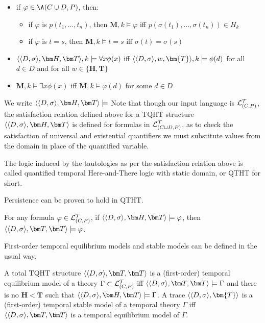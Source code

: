\begin{itemize}
  \item if $\varphi \in \A(C \cup D,P)$, then:
    \begin{itemize}
    \item if $\varphi$ is $p(t_1,\dots,t_n)$, then $\bm{M},k \models \varphi$ iff $p(\sigma(t_1), \dots, \sigma(t_n))\in H_k$
    \item if $\varphi$ is $t = s$, then  $\bm{M},k \models t = s$ iff $\sigma(t) = \sigma(s)$
    \end{itemize}
  \item $\qthandt,k \models \forall x \phi(x)$ iff $\langle \dsigma, w,\bm{T} \rangle,k \models \phi(d)$ for all $d \in D$ and for all $w \in \{\bm{H}, \bm{T}\}$ 
  \item $\bm{M},k \models \exists x \phi(x)$ iff $\bm{M},k \models \varphi(d)$ for some $d \in D$
  \end{itemize}
  We write $\qthandt \models$
Note that though our input language is $\mathcal{L}_{(C,P)}^\mathcal{T}$, the satisfaction
relation defined above for a TQHT structure $\qthandt$ is defined for
formulas in $\mathcal{L}_{(C \cup D,P)}^\mathcal{T}$, as to check the satisfaction of universal and
existential quantifiers we must substitute values from the domain in
place of the quantified variable.

The logic induced by the tautologies as per the satisfaction relation
above is called quantified temporal Here-and-There logic with static
domain, or QTHT for short.

Persistence can be proven to hold in QTHT.

\begin{proposition}
  For any formula $\varphi \in \mathcal{L}_{(C,P)}^\mathcal{T}$, if $\qthandt \models \varphi$, then
  $\qttandt \models \varphi$.
\end{proposition}

First-order temporal equilibrium models and stable models can be defined in the usual way.

\begin{definition}
  A total TQHT structure $\qttandt$ is a (first-order) temporal
  equilibrium model of a theory $\Gamma \subset \mathcal{L}_{(C,P)}^\mathcal{T}$ iff
  $\qttandt \models \Gamma$ and there is no $\bm{H} < \bm{T}$ such
  that $\qthandt \models \Gamma$. A trace
  $\langle \dsigma, \bm{T} \rangle$ is a (first-order) temporal stable
  model of a temporal theory $\Gamma$ iff $\qttandt$ is a temporal
  equilibrium model of $\Gamma$.
\end{definition}

